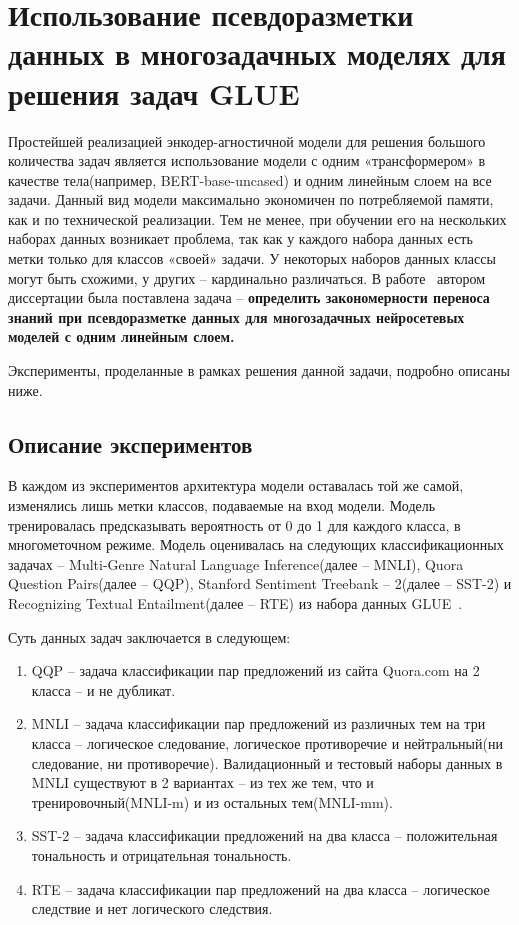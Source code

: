 \chapter{Использование псевдоразметки данных в многозадачных моделях для решения задач GLUE}\label{ch:pseudolabel}

Простейшей реализацией энкодер-агностичной модели для решения большого количества задач является использование модели с одним «трансформером» в качестве тела(например, BERT-base-uncased) и одним линейным слоем на все задачи. Данный вид модели максимально экономичен по потребляемой памяти, как и по технической реализации. Тем не менее, при обучении его на нескольких наборах данных возникает проблема, так как у каждого набора данных есть метки только для классов «своей» задачи. У некоторых наборов данных классы могут быть схожими, у других -- кардинально различаться. В работе~\cite{pseudolabel} автором диссертации была поставлена задача -- \textbf{определить закономерности переноса знаний при псевдоразметке данных для многозадачных нейросетевых моделей с одним линейным слоем.}

Эксперименты, проделанные в рамках решения данной задачи, подробно описаны ниже.




\section{Описание экспериментов}\label{ch:pseudolabel/sect1}
В каждом из экспериментов архитектура модели оставалась той же самой, изменялись лишь метки классов, подаваемые на вход модели. Модель тренировалась предсказывать вероятность от 0 до 1 для каждого класса, в многометочном режиме.
Модель оценивалась на следующих классификационных задачах -- Multi-Genre Natural Language Inference(далее -- MNLI), Quora Question Pairs(далее -- QQP), Stanford Sentiment Treebank -- 2(далее -- SST-2) и Recognizing Textual Entailment(далее -- RTE) из набора данных GLUE~\cite{wang_2018}. 

Суть данных задач заключается в следующем:
\begin{enumerate}
    \item QQP -- задача классификации пар предложений из сайта Quora.com на 2 класса -- и не дубликат.
    \item MNLI -- задача классификации пар предложений из различных тем на три класса -- логическое следование, логическое противоречие и нейтральный(ни следование, ни противоречие). Валидационный и тестовый наборы данных в MNLI существуют в 2 вариантах -- из тех же тем, что и тренировочный(MNLI-m) и из остальных тем(MNLI-mm).
    \item SST-2 -- задача классификации предложений на два класса -- положительная тональность и отрицательная тональность.
    \item RTE --  задача классификации пар предложений на два класса -- логическое следствие и нет логического следствия.
\end{enumerate}

